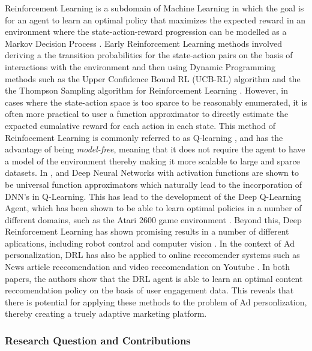 \documentclass{mldsmsc}
\begin{document}
Reinforcement Learning is a subdomain of Machine Learning in which the goal is for an agent to
learn an optimal policy that maximizes the expected reward in an environment where the
state-action-reward progression can be modelled as a Markov Decision Process
\citep{puterman2014markov}. Early Reinforcement Learning methods involved 
deriving a the transition probabilities for the state-action pairs on the basis of interactions
with the environment and then using Dynamic Programming methods such as the Upper Confidence
Bound RL (UCB-RL) algorithm \citep{RefWorks:auer2008near-optimal} and the
the Thompson Sampling algorithm for Reinforcement Learning \citep{RefWorks:pike-burke2024optimism/thompson}.
However, in cases where the state-action space is too sparce to be
reasonably enumerated, it is often more practical to user a function approximator 
to directly estimate the expacted cumalative reward for each action in each state. This method of Reinfocement
Learning is commonly referred to as Q-learning \citep{RefWorks:watkins1989learning},
and has the advantage of being \emph{model-free}, meaning that
it does not require the agent to have a model of the environment
thereby making it more scalable to large and sparce datasets. In \citep{RefWorks:hornik1989multilayer},
\citep{RefWorks:cybenko1989approximation} and \citep{RefWorks:hornik1990universal} Deep
Neural Networks with activation functions are shown to be universal function approximators
which naturally lead to the incorporation of DNN's in Q-Learning. This has lead to the
development of the Deep Q-Learning Agent, which has been shown to be able to learn optimal
policies in a number of different domains, such as the Atari 2600 game environment \cite{RefWorks:mnih2015human-level}.
Beyond this, Deep Reinforcement Learning has shown promising results in a number
of different aplications, including robot control and computer vision \citep{RefWorks:wang2024deep}.
In the context of Ad personalization, DRL has also be applied to online reccomender systems
such as News article reccomendation \citep{RefWorks:zheng2018drn:} and video
reccomendation on Youtube \citep{RefWorks:chen2019top-k}. In both papers,
the authors show that the DRL agent is able to learn an optimal content reccomendation
policy on the basis of user engagement data. This reveals that there is potential
for applying these methods to the problem of Ad personlization, thereby creating a 
truely adaptive marketing platform.

\subsubsection{Research Question and Contributions}
\end{document}
